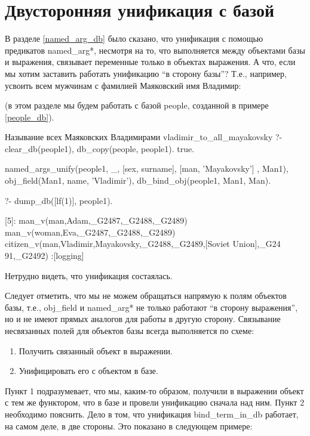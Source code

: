 \documentclass[a4paper]{book}
\def\te{т.\thinspace е.}
\def\Te{Т.\thinspace е.}
\def\na{named\_arg*}
\begin{document}
\section{Двусторонняя унификация с базой}
\label{db_bind_obj}

В разделе \ref{named_arg_db} было сказано, что унификация с
помощью предикатов \na{}, несмотря на то, что выполняется между
объектами базы и выражения, связывает переменные только в
объектах выражения. А что, если мы хотим заставить работать
унификацию ``в сторону базы''? \Te, например, усвоить всем
мужчинам с фамилией Маяковский имя Владимир:

(в этом разделе мы будем работать с базой people, созданной в
примере \ref{people_db}).

\begin{example}{Называние всех Маяковских Владимирами}%
               {vladimir_to_all_mayakovsky}
?- clear_db(people1), db_copy(people, people1).
true.

named_args_unify(people1, _, 
      [sex, surname], [man, 'Mayakovsky'] , Man1), 
   obj_field(Man1, name, 'Vladimir'), 
   db_bind_obj(people1, Man1, Man).

?- dump_db([lf(1)], people1).

[5]: man_v(man,Adam,_G2487,_G2488,_G2489) 
man_v(woman,Eva,_G2487,_G2488,_G2489) 
citizen_v(man,Vladimir,Mayakovsky,_G2488,_G2489,[Soviet Union],_G24
91,_G2492)                                                        
 :[logging]
\end{example}

Нетрудно видеть, что унификация состаялась.

Следует отметить, что мы не можем обращаться напрямую к полям
объектов базы, \te, obj\_field и \na{} не только работают ``в
сторону выражения'', но и не имеют прямых аналогов для работы в
другую сторону. Связывание несвязанных полей для объектов базы
всегда выполняется по схеме:

\begin{enumerate}
\item Получить связанный объект в выражении.
\item Унифицировать его с объектом в базе.
\end{enumerate}

Пункт 1 подразумевает, что мы, каким-то образом, получили в
выражении объект с тем же функтором, что в базе и провели
унификацию сначала над ним. Пункт 2 необходимо пояснить. Дело в
том, что унификация bind\_term\_in\_db работает, на самом деле, в
две стороны. Это показано в следующем примере:
\end{document}
